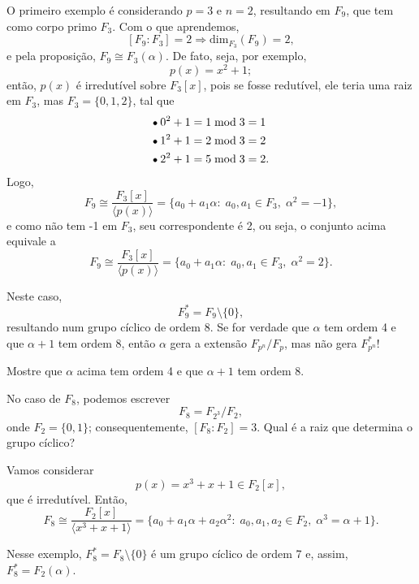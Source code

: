 \documentclass[../algebraIII_notes.tex]{subfiles}
\begin{document}
\begin{example}
	O primeiro exemplo é considerando \(p=3\) e \(n=2\), resultando em \(F_{9}\), que tem como corpo primo \(F_{3}\). Com o que aprendemos,
	\[
		[F_{9}: F_{3}]=2 \Rightarrow \mathrm{dim}_{F_{3}}(F_{9}) = 2,
	\]
	e pela proposição, \(F_{9}\cong F_{3}(\alpha )\). De fato, seja, por exemplo,
	\[
		p(x) = x^{2}+1;
	\]
	então, \(p(x)\) é irredutível sobre \(F_{3}[x]\), pois se fosse redutível, ele teria uma raiz em \(F_{3}\), mas \(F_{3} = \{0, 1, 2\}\), tal que
	\begin{align*}
		 & \tikz[baseline=-0.5ex]\draw[black, fill=black, radius=1.5pt](0, 0)circle;\; 0^{2} + 1 = 1\;\mathrm{mod}\; 3=1  \\
		 & \tikz[baseline=-0.5ex]\draw[black, fill=black, radius=1.5pt](0, 0)circle;\; 1^{2} + 1 = 2\;\mathrm{mod}\; 3=2  \\
		 & \tikz[baseline=-0.5ex]\draw[black, fill=black, radius=1.5pt](0, 0)circle;\; 2^{2} + 1 = 5\;\mathrm{mod}\; 3=2.
	\end{align*}
	Logo,
	\[
		F_{9} \cong \frac{F_{3}[x]}{\langle p(x) \rangle} = \{a_{0}+a_1 \alpha :\; a_{0}, a_1\in F_{3},\; \alpha^{2}=-1\},
	\]
	e como não tem -1 em \(F_{3}\), seu correspondente é 2, ou seja, o conjunto acima equivale a
	\[
		F_{9} \cong \frac{F_{3}[x]}{\langle p(x) \rangle} = \{a_{0}+a_1 \alpha :\; a_{0}, a_1\in F_{3},\; \alpha^{2}=2\}.
	\]

	Neste caso,
	\[
		F_{9}^{*} = F_{9}\setminus{\{0\}},
	\]
	resultando num grupo cíclico de ordem 8. Se for verdade que \(\alpha \) tem ordem 4 e que \(\alpha + 1\) tem ordem 8, então \(\alpha \) gera a extensão \(F_{p^{n}}/F_{p}\), mas não gera \(F_{p^{n}}^{*}\)!
\end{example}
\begin{exr}
	Mostre que \(\alpha \) acima tem ordem 4 e que \(\alpha +1\) tem ordem 8.
\end{exr}
\begin{example}
	No caso de \(F_{8}\), podemos escrever
	\[
		F_{8} = F_{2^{3}}/F_{2},
	\]
	onde \(F_{2} = \{0, 1\}\); consequentemente, \([F_{8}:F_{2}]=3\). Qual é a raiz que determina o grupo cíclico?

	Vamos considerar
	\[
		p(x) = x^{3} + x+1\in F_{2}[x],
	\]
	que é irredutível. Então,
	\[
		F_{8}\cong \frac{F_{2}[x]}{\langle x^{3}+x+1 \rangle} = \{a_{0}+a_1\alpha +a_2\alpha^{2}:\; a_{0}, a_1, a_2\in F_{2},\; \alpha^{3} = \alpha +1\}.
	\]

	Nesse exemplo, \(F_{8}^{*} = F_{8}\setminus{\{0\}}\) é um grupo cíclico de ordem 7 e, assim, \(F_{8}^{*} = F_{2}(\alpha )\).
\end{example}
\end{document}
